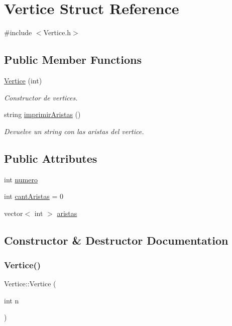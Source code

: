 \hypertarget{structVertice}{}\section{Vertice Struct Reference}
\label{structVertice}


{\ttfamily \#include $<$Vertice.\+h$>$}

\subsection*{Public Member Functions}
\begin{DoxyCompactItemize}
\item 
\hyperlink{structVertice_a0a98eb42f9e5c9d7b293548b9cad89e4}{Vertice} (int)
\begin{DoxyCompactList}\small\item\em Constructor de vertices. \end{DoxyCompactList}\item 
string \hyperlink{structVertice_aad9de18b651baaa1cbc175aa6b492935}{imprimir\+Aristas} ()
\begin{DoxyCompactList}\small\item\em Devuelve un string con las aristas del vertice. \end{DoxyCompactList}\end{DoxyCompactItemize}
\subsection*{Public Attributes}
\begin{DoxyCompactItemize}
\item 
int \hyperlink{structVertice_a20682b863309e4bac1916f4b71586a48}{numero}
\item 
int \hyperlink{structVertice_abde74728052701740c6f043c3729f91b}{cant\+Aristas} = 0
\item 
vector$<$ int $>$ \hyperlink{structVertice_a444d610323bf6d21b796f4847a347de6}{aristas}
\end{DoxyCompactItemize}


\subsection{Constructor \& Destructor Documentation}
\mbox{\label{structVertice_a0a98eb42f9e5c9d7b293548b9cad89e4}} 
\subsubsection{\texorpdfstring{Vertice()}{Vertice()}}
{\footnotesize\ttfamily Vertice\+::\+Vertice (\begin{DoxyParamCaption}\item[{int}]{n }\end{DoxyParamCaption})}



